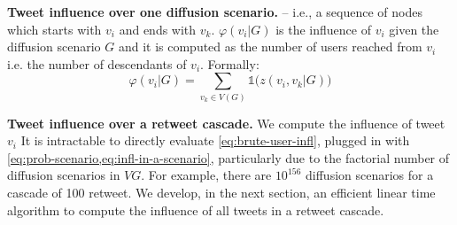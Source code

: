 \textbf{Tweet influence over one diffusion scenario.}
%
-- i.e., a  sequence of nodes which starts with $v_i$ and ends with $v_k$.
$\varphi(v_i | G)$ is the influence of $v_i$ given the diffusion scenario $G$ and it is computed as the number of users reached from $v_i$ i.e. the number of descendants of $v_i$.
Formally:
\begin{equation}
	\varphi(v_i|G) 	=  \sum_{v_k \in V(G)} \mathds{1} \big(z(v_i,v_k | G) ) \label{eq:infl-in-a-scenario}
\end{equation}


\textbf{Tweet influence over a retweet cascade.}
We compute the influence of tweet $v_i$
It is intractable to directly evaluate \cref{eq:brute-user-infl}, plugged in with \cref{eq:prob-scenario,eq:infl-in-a-scenario}, particularly due to the factorial number of diffusion scenarios in $VG$.
For example, there are $10^{156}$ diffusion scenarios for a cascade of 100 retweet.
We develop, in the next section, an efficient linear time algorithm to compute the influence of all tweets in a retweet cascade.

